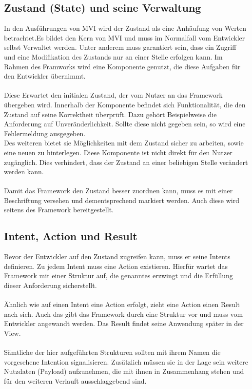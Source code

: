 \subsection{Zustand (State) und seine Verwaltung}
In den Ausführungen von MVI wird der Zustand als eine Anhäufung von Werten betrachtet.Es bildet den Kern von MVI und muss im Normalfall vom Entwickler selbst Verwaltet werden. Unter anderem muss garantiert sein, dass ein Zugriff und eine Modifikation des Zustands nur an einer Stelle erfolgen kann. Im Rahmen des Framworks wird eine Komponente genutzt, die diese Aufgaben für den Entwickler übernimmt.
\\
\\
Diese Erwartet den initialen Zustand, der vom Nutzer an das Framework übergeben wird. Innerhalb der Komponente befindet sich Funktionalität, die den Zustand auf seine Korrektheit überprüft. Dazu gehört Beispielweise die Anforderung auf Unveränderlichkeit. Sollte diese nicht gegeben sein, so wird eine Fehlermeldung ausgegeben.
\\
Des weiteren bietet sie Möglichkeiten mit dem Zustand sicher zu arbeiten, sowie eine neuen zu hinterlegen. Diese Komponente ist nicht direkt für den Nutzer zugänglich. Dies verhindert, dass der Zustand an einer beliebigen Stelle verändert werden kann.
\\
\\
Damit das Framework den Zustand besser zuordnen kann, muss es mit einer Beschriftung versehen und dementsprechend markiert werden. Auch diese wird seitens des Framework bereitgestellt.

\subsection{Intent, Action und Result}
Bevor der Entwickler auf den Zustand zugreifen kann, muss er seine Intents definieren. Zu jedem Intent muss eine Action existieren. Hierfür wartet das Framework mit einer Struktur auf, die genanntes erzwingt und die Erfüllung dieser Anforderung sicherstellt. 
\\
\\
Ähnlich wie auf einen Intent eine Action erfolgt, zieht eine Action einen Result nach sich. Auch das gibt das Framework durch eine Struktur vor und muss vom Entwickler angewandt werden. Das Result findet seine Anwendung später in der View.
\\
\\
Sämtliche der hier aufgeführten Strukturen sollten mit ihrem Namen die vorgesehene Intention signalisieren. Zusätzlich müssen sie in der Lage sein weitere Nutzdaten (Payload) aufzunehmen, die mit ihnen in Zusammenhang stehen und für den weiteren Verlauft ausschlaggebend sind.

